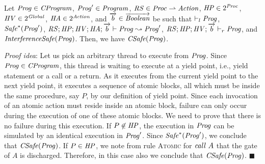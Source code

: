 \begin{lemma}
\label{lemma:refinement-base}
Let $\mathit{Prog} \in \mathit{CProgram}$, $\mathit{Prog}' \in \mathit{Program}$,
$\mathit{RS} \in \mathit{Proc} \rightharpoonup \mathit{Action}$, $\mathit{HP} \in 2^{\mathit{Proc}}$, $\mathit{HV} \in 2^{\mathit{Global}}$, $\mathit{HA} \in 2^{\mathit{Action}}$,
and $\overrightarrow{b} \in \overrightarrow{\mathit{Boolean}}$ be such that 
$\vdash_l \mathit{Prog}$, $\mathit{Safe}^*(\mathit{Prog}')$,
$\mathit{RS};\mathit{HP};\mathit{HV};\mathit{HA};\overrightarrow{b} \vdash \mathit{Prog} \leadsto \mathit{Prog}'$, $\mathit{RS};\mathit{HP};\mathit{HV};\overrightarrow{b} \vdash_r \mathit{Prog}$, and
$\mathit{InterferenceSafe}(\mathit{Prog})$.
Then, we have $\mathit{CSafe}(\mathit{Prog})$.
\end{lemma}
{\em Proof idea}:
Let us pick an arbitrary thread to execute from $\mathit{Prog}$.
Since $\mathit{Prog} \in \mathit{CProgram}$, this thread is waiting to execute at a yield point, i.e., yield statement or a call or a return.
As it executes from the current yield point to the next yield point, it executes a sequence of atomic blocks,
all which must be inside the same procedure, say $P$, by our definition of yield point.
Since each invocation of an atomic action must reside inside an atomic block, failure can only occur
during the execution of one of these atomic blocks.
We need to prove that there is no failure during this execution.
If $P \not \in \mathit{HP}$, the execution in $\mathit{Prog}$ can be simulated by an identical execution in $\mathit{Prog}'$.
Since $\mathit{Safe}^*(\mathit{Prog}')$, we conclude that $\mathit{CSafe}(\mathit{Prog})$.
If $P \in \mathit{HP}$, we note from rule \textsc{Atomic} for $\mathit{call}\ A$ that the gate of $A$ is discharged.
Therefore, in this case also we conclude that $\mathit{CSafe}(\mathit{Prog})$.
$\blacksquare$

